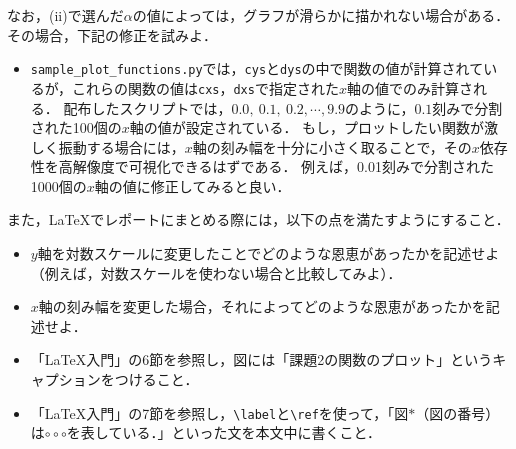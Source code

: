 \documentclass[a4paper,12pt]{jsarticle}
\begin{document}
なお，(ii)で選んだ$\alpha$の値によっては，グラフが滑らかに描かれない場合がある．
その場合，下記の修正を試みよ．
\begin{itemize}
    \item \texttt{sample\_plot\_functions.py}では，\texttt{cys}と\texttt{dys}の中で関数の値が計算されているが，これらの関数の値は\texttt{cxs}，\texttt{dxs}で指定された$x$軸の値でのみ計算される．
    配布したスクリプトでは，$0.0,~0.1,~0.2, \cdots, 9.9$のように，$0.1$刻みで分割された100個の$x$軸の値が設定されている．
    もし，プロットしたい関数が激しく振動する場合には，$x$軸の刻み幅を十分に小さく取ることで，その$x$依存性を高解像度で可視化できるはずである．
    例えば，0.01刻みで分割された1000個の$x$軸の値に修正してみると良い．
\end{itemize}
また，\LaTeX でレポートにまとめる際には，以下の点を満たすようにすること．
\begin{itemize}
    \item $y$軸を対数スケールに変更したことでどのような恩恵があったかを記述せよ（例えば，対数スケールを使わない場合と比較してみよ）．
    \item $x$軸の刻み幅を変更した場合，それによってどのような恩恵があったかを記述せよ．
    \item 「\LaTeX 入門」の6節を参照し，図には「課題2の関数のプロット」というキャプションをつけること．
    \item 「\LaTeX 入門」の7節を参照し，\texttt{\textbackslash label}と\texttt{\textbackslash ref}を使って，「図$*$（図の番号）は$\circ\circ\circ$を表している．」といった文を本文中に書くこと．
\end{itemize}



\section{}
\label{sec:problem_3}
\end{document}

